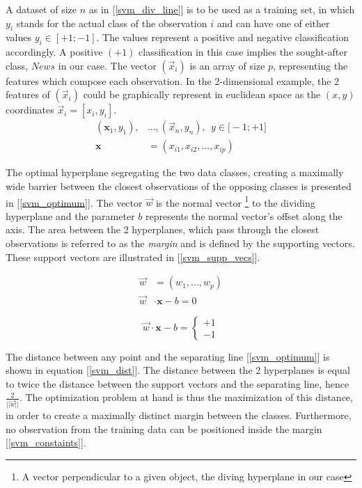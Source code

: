  A dataset of size $n$ as in [\ref{svm_div_line}] is to be used as a training set, in which $y_i$ stands for the actual class of the observation $i$ and can have one of either values $y_i \in [+1;-1] $. The values represent a positive and negative classification accordingly. A positive $(+1)$ classification in this case implies the sought-after class, $News$ in our case. The vector $(\vec{x}_i)$ is an array of size $p$, representing the features which compose each observation. In the 2-dimensional example, the 2 features of $(\vec{x}_i)$ could be graphically represent in euclidean space as the $(x,y)$ coordinates $\vec{x}_i = [x_i,y_i]$. 
	\begin{equation}
		\begin{aligned}
			(\textbf{x}_1,y_1),& ... , (\vec{x}_n,y_n), \ \ y \in \big[-1;+1 \big] \\
			\textbf{x}& = (x_{i1},x_{i2}, ...,x_{ip})
		\end{aligned}
	\label{svm_div_line}
	\end{equation}
	
	The optimal hyperplane segregating the two data classes, creating a maximally wide barrier between the closest observations of the opposing classes is presented in [\ref{svm_optimum}]. The vector $\vec{w}$ is the normal vector \footnote{A vector perpendicular to a given object, the diving hyperplane in our case} to the dividing hyperplane and the parameter $b$ represents the normal vector's offset along the axis. The area between the 2 hyperplanes, which pass through the closest observations is referred to as the \textit{margin} and is defined by the supporting vectors. These support vectors are illustrated in [\ref{svm_supp_vecs}].
	
	\begin{equation}
		\begin{aligned}
			\vec{w}& = (w_1, ... , w_p) \\
			\vec{w}& \cdot \textbf{x} - b = 0 
		\end{aligned}
		\label{svm_optimum}
	\end{equation}
	
	\begin{equation}
		\vec{w} \cdot \textbf{x} - b = 
		\begin{cases}
			+1 \\
			-1 
		\end{cases}
		\label{svm_supp_vecs}
	\end{equation}
	
	The distance between any point and the separating line [\ref{svm_optimum}] is shown in equation [\ref{svm_dist}].
	The distance between the 2 hyperplanes is equal to twice the distance between the support vectors and the separating line, hence $ \frac{2}{||\vec{w}||} $. The optimization problem at hand is thus the maximization of this distance, in order to create a maximally distinct margin between the classes. Furthermore, no observation from the training data can be positioned inside the margin [\ref{svm_constaints}].
	

